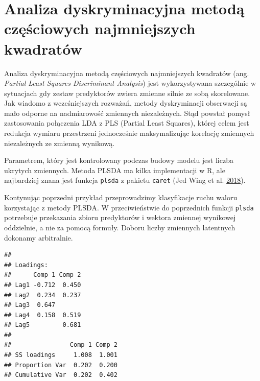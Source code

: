 \documentclass[]{book}
\newenvironment{Shaded}{\begin{snugshade}}{\end{snugshade}}
\newcommand{\DataTypeTok}[1]{\textcolor[rgb]{0.13,0.29,0.53}{#1}}
\newcommand{\DecValTok}[1]{\textcolor[rgb]{0.00,0.00,0.81}{#1}}
\newcommand{\KeywordTok}[1]{\textcolor[rgb]{0.13,0.29,0.53}{\textbf{#1}}}
\newcommand{\NormalTok}[1]{#1}
\newcommand{\OperatorTok}[1]{\textcolor[rgb]{0.81,0.36,0.00}{\textbf{#1}}}
\newcommand{\StringTok}[1]{\textcolor[rgb]{0.31,0.60,0.02}{#1}}
\theoremstyle{plain}
\theoremstyle{definition}
\theoremstyle{definition}
\theoremstyle{definition}
\theoremstyle{definition}
\theoremstyle{remark}
\let\BeginKnitrBlock\begin \let\EndKnitrBlock\end
\begin{document}
\hypertarget{analiza-dyskryminacyjna-metoda-czesciowych-najmniejszych-kwadratow}{%
\section{Analiza dyskryminacyjna metodą częściowych najmniejszych kwadratów}\label{analiza-dyskryminacyjna-metoda-czesciowych-najmniejszych-kwadratow}}

Analiza dyskryminacyjna metodą częściowych najmniejszych kwadratów (ang. \emph{Partial Least Squares Discriminant Analysis}) jest wykorzystywana szczególnie w sytuacjach gdy zestaw predyktorów zwiera zmienne silnie ze sobą skorelowane. Jak wiadomo z wcześniejszych rozważań, metody dyskryminacji obserwacji są mało odporne na nadmiarowość zmiennych niezależnych. Stąd powstał pomysł zastosowania połączenia LDA z PLS (Partial Least Squares), której celem jest redukcja wymiaru przestrzeni jednocześnie maksymalizując korelację zmiennych niezależnych ze zmienną wynikową.

Parametrem, który jest kontrolowany podczas budowy modelu jest liczba ukrytych zmiennych. Metoda PLSDA ma kilka implementacji w R, ale najbardziej znana jest funkcja \texttt{plsda} z pakietu \texttt{caret} (Jed Wing et al. \protect\hyperlink{ref-kuhn}{2018}).

\BeginKnitrBlock{example}
\protect\hypertarget{exm:plsda}{}{\label{exm:plsda} }Kontynując poprzedni przykład przeprowadzimy klasyfikacje ruchu waloru korzystając z metody PLSDA. W przeciwieństwie do poprzednich funkcji \texttt{plsda} potrzebuje przekazania zbioru predyktorów i wektora zmiennej wynikowej oddzielnie, a nie za pomocą formuły. Doboru liczby zmiennych latentnych dokonamy arbitralnie.
\EndKnitrBlock{example}

\begin{Shaded}
\end{Shaded}

\begin{verbatim}
## 
## Loadings:
##      Comp 1 Comp 2
## Lag1 -0.712  0.450
## Lag2  0.234  0.237
## Lag3  0.647       
## Lag4  0.158  0.519
## Lag5         0.681
## 
##                Comp 1 Comp 2
## SS loadings     1.008  1.001
## Proportion Var  0.202  0.200
## Cumulative Var  0.202  0.402
\end{verbatim}
\end{document}
